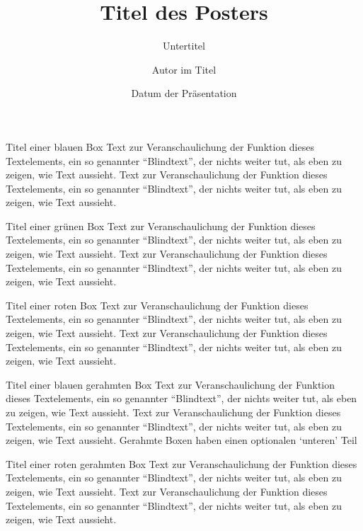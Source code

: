 \documentclass[german,portrait]{univie-ling-poster}
\author[Autor in Fußzeile]{Autor im Titel}
\title{Titel des Posters}
\subtitle{Untertitel}
\date{Datum der Präsentation}
\begin{document}
\begin{frame}

\begin{bluebox}{Titel einer blauen Box}
	Text zur Veranschaulichung der Funktion dieses Textelements, ein so
	genannter \enquote{Blindtext}, der nichts weiter tut, als eben zu zeigen,
	wie Text aussieht. Text zur Veranschaulichung der Funktion dieses Textelements, ein so
	genannter \enquote{Blindtext}, der nichts weiter tut, als eben zu zeigen,
	wie Text aussieht.
\end{bluebox}

\begin{greenbox}{Titel einer grünen Box}
	Text zur Veranschaulichung der Funktion dieses Textelements, ein so
	genannter \enquote{Blindtext}, der nichts weiter tut, als eben zu zeigen,
	wie Text aussieht. Text zur Veranschaulichung der Funktion dieses Textelements, ein so
	genannter \enquote{Blindtext}, der nichts weiter tut, als eben zu zeigen,
	wie Text aussieht.
\end{greenbox}


\begin{redbox}{Titel einer roten Box}
	Text zur Veranschaulichung der Funktion dieses Textelements, ein so
	genannter \enquote{Blindtext}, der nichts weiter tut, als eben zu zeigen,
	wie Text aussieht. Text zur Veranschaulichung der Funktion dieses Textelements, ein so
	genannter \enquote{Blindtext}, der nichts weiter tut, als eben zu zeigen,
	wie Text aussieht.
\end{redbox}

\begin{blueframedbox}{Titel einer blauen gerahmten Box}
	Text zur Veranschaulichung der Funktion dieses Textelements, ein so
	genannter \enquote{Blindtext}, der nichts weiter tut, als eben zu zeigen,
	wie Text aussieht. Text zur Veranschaulichung der Funktion dieses Textelements, ein so
	genannter \enquote{Blindtext}, der nichts weiter tut, als eben zu zeigen,
	wie Text aussieht.
	\tcblower
	Gerahmte Boxen haben einen optionalen \enquote*{unteren} Teil
\end{blueframedbox}

\begin{redframedbox}{Titel einer roten gerahmten Box}
	Text zur Veranschaulichung der Funktion dieses Textelements, ein so
	genannter \enquote{Blindtext}, der nichts weiter tut, als eben zu zeigen,
	wie Text aussieht. Text zur Veranschaulichung der Funktion dieses Textelements, ein so
	genannter \enquote{Blindtext}, der nichts weiter tut, als eben zu zeigen,
	wie Text aussieht.
\end{redframedbox}


\end{frame}
\end{document}
